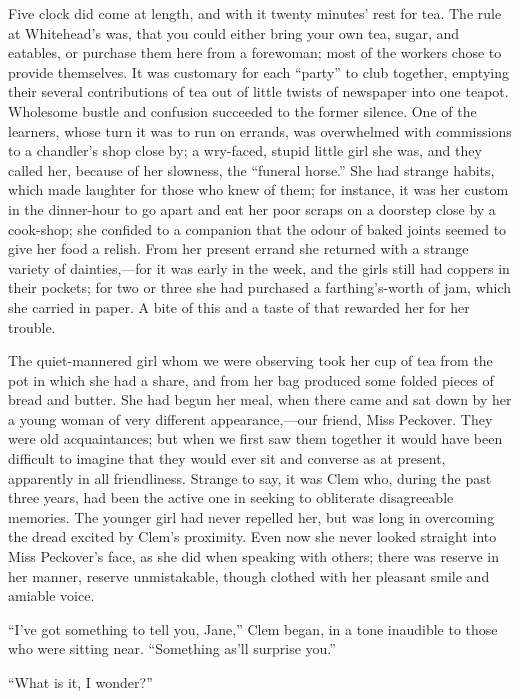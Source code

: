 Five clock did come at length, and with it twenty minutes' rest for tea.
The rule at Whitehead's was, that you could either bring your own tea,
sugar, and eatables, or purchase them here from a forewoman; most of the
workers chose to provide themselves. It was customary for each ``party''
to club together, emptying their several contributions of tea out of
little twists of newspaper into one teapot. Wholesome bustle and
confusion succeeded to the former silence. One of the
{\protect\hypertarget{22}{}{}}learners, whose turn it was to run on
errands, was overwhelmed with commissions to a chandler's shop close by;
a wry-faced, stupid little girl she was, and they called her, because of
her slowness, the ``funeral horse.'' She had strange habits, which made
laughter for those who knew of them; for instance, it was her custom in
the dinner-hour to go apart and eat her poor scraps on a doorstep close
by a cook-shop; she confided to a companion that the odour of baked
joints seemed to give her food a relish. From her present errand she
returned with a strange variety of dainties,---for it was early in the
week, and the girls still had coppers in their pockets; for two or three
she had purchased a farthing's-worth of jam, which she carried in paper.
A bite of this and a taste of that rewarded her for her trouble.

The quiet-mannered girl whom we were observing took her cup of tea from
the pot in which she had a share, and from her bag produced some folded
pieces of bread and butter. She had begun her meal, when there came
{\protect\hypertarget{23}{}{}}and sat down by her a young woman of very
different appearance,---our friend, Miss Peckover. They were old
acquaintances; but when we first saw them together it would have been
difficult to imagine that they would ever sit and converse as at
present, apparently in all friendliness. Strange to say, it was Clem
who, during the past three years, had been the active one in seeking to
obliterate disagreeable memories. The younger girl had never repelled
her, but was long in overcoming the dread excited by Clem's proximity.
Even now she never looked straight into Miss Peckover's face, as she did
when speaking with others; there was reserve in her manner, reserve
unmistakable, though clothed with her pleasant smile and amiable voice.

``I've got something to tell you, Jane,'' Clem began, in a tone
inaudible to those who were sitting near. ``Something as'll surprise
you.''

``What is it, I wonder?''

